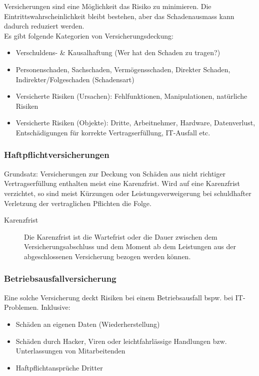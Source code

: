 Versicherungen sind eine Möglichkeit das Risiko zu minimieren. Die
Eintrittswahrscheinlichkeit bleibt bestehen, aber das Schadenausmass kann
dadurch reduziert werden.\\

Es gibt folgende Kategorien von Versicherungsdeckung:
\begin{itemize}
	\tightlist
	\item Verschuldens- \& Kausalhaftung (Wer hat den Schaden zu tragen?)
	\item Personenschaden, Sachschaden, Vermögensschaden, Direkter Schaden,
	Indirekter/Folgeschaden (Schadensart)
	\item Versicherte Risiken (Ursachen): Fehlfunktionen, Manipulationen,
	natürliche Risiken
	\item Versicherte Risiken (Objekte): Dritte, Arbeitnehmer, Hardware,
	Datenverlust, Entschädigungen für korrekte Vertragserfüllung,
	IT-Ausfall etc.
\end{itemize}

\subsubsection{Haftpflichtversicherungen}
Grundsatz: Versicherungen zur Deckung von Schäden aus
nicht richtiger Vertragserfüllung enthalten meist eine
Karenzfrist. Wird auf eine Karenzfrist verzichtet, so sind meist
Kürzungen oder Leistungsverweigerung bei schuldhafter
Verletzung der vertraglichen Pflichten die Folge.

\begin{description}
	\item[Karenzfrist] Die Karenzfrist ist die Wartefrist oder die Dauer
	zwischen dem Versicherungsabschluss und dem Moment ab dem Leistungen aus der
	abgeschlossenen Versicherung bezogen werden können.
\end{description}

\subsubsection{Betriebsausfallversicherung}
Eine solche Versicherung deckt Risiken bei einem Betriebsausfall bspw. bei
IT-Problemen. Inklusive:

\begin{itemize}
	\tightlist
	\item Schäden an eigenen Daten (Wiederherstellung)
	\item Schäden durch Hacker, Viren oder leichtfahrlässige Handlungen
	bzw. Unterlassungen von Mitarbeitenden
	\item Haftpflichtansprüche Dritter
\end{itemize}

